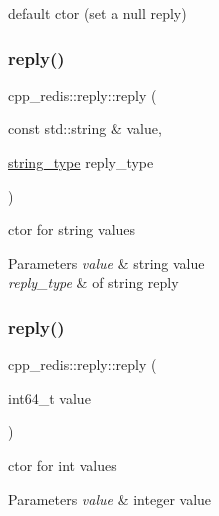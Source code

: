 default ctor (set a null reply) \mbox{\label{classcpp__redis_1_1reply_a58fb2a051a001f1c3dcf2cd957441dbc}} 
\subsubsection{\texorpdfstring{reply()}{reply()}\hspace{0.1cm}{\footnotesize\ttfamily [2/4]}}
{\footnotesize\ttfamily cpp\+\_\+redis\+::reply\+::reply (\begin{DoxyParamCaption}\item[{const std\+::string \&}]{value,  }\item[{\mbox{\hyperlink{classcpp__redis_1_1reply_ac192ba4cb8f2bb6e7cb465edf755328b}{string\+\_\+type}}}]{reply\+\_\+type }\end{DoxyParamCaption})}

ctor for string values


\begin{DoxyParams}{Parameters}
{\em value} & string value \\
\hline
{\em reply\+\_\+type} & of string reply \\
\hline
\end{DoxyParams}
\mbox{\label{classcpp__redis_1_1reply_a6200b9fa76196e75fb18aa07e47391f0}} 
\subsubsection{\texorpdfstring{reply()}{reply()}\hspace{0.1cm}{\footnotesize\ttfamily [3/4]}}
{\footnotesize\ttfamily cpp\+\_\+redis\+::reply\+::reply (\begin{DoxyParamCaption}\item[{int64\+\_\+t}]{value }\end{DoxyParamCaption})}

ctor for int values


\begin{DoxyParams}{Parameters}
{\em value} & integer value \\
\hline
\end{DoxyParams}
\mbox{\label{classcpp__redis_1_1reply_af3e08b6b795978757a05a1ac4bb08c68}} 
